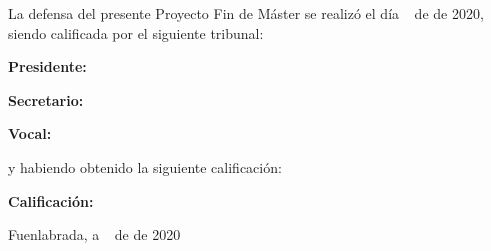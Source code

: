 \vspace{1cm}
La defensa del presente Proyecto Fin de Máster se realizó el día \qquad$\;\,$ de \qquad\qquad\qquad\qquad \newline de 2020, siendo calificada por el siguiente tribunal:


\vspace{0.5cm}
\textbf{Presidente:}

\vspace{1.2cm}
\textbf{Secretario:}

\vspace{1.2cm}
\textbf{Vocal:}

\vspace{1.2cm}
y habiendo obtenido la siguiente calificación:

\vspace{1cm}
\textbf{Calificación:}


\vspace{1cm}
\begin{flushright}
Fuenlabrada, a \qquad$\;\,$ de \qquad\qquad\qquad\qquad de 2020
\end{flushright}


